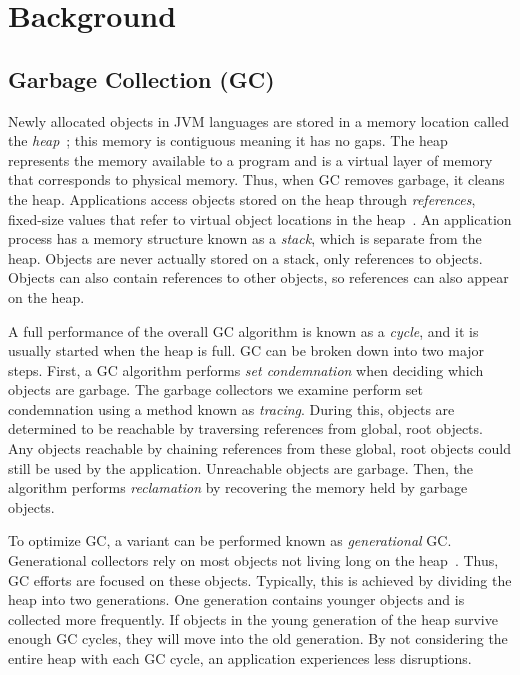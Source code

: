 \documentclass{sig-alternate}
\begin{document}
\section{Background}
\label{sec:background}


\subsection{Garbage Collection (GC)}
\label{sec:garbageCollection}

Newly allocated objects in JVM languages are stored in a memory location called
the \emph{heap}~\cite{oracle:heap}; this memory is contiguous meaning it has no gaps. The heap represents the memory available to a program and is a virtual layer of memory that corresponds to physical memory.
Thus, when GC removes garbage, it cleans the heap.
Applications access objects stored on the heap through \emph{references},
fixed-size values that refer to virtual object locations in the heap~\cite{reilly:reference}. 
An application process has a memory structure known
as a \emph{stack}, which is separate from the heap. Objects are never actually
stored on a stack, only references to objects.
Objects can also contain references to other objects, so references can also appear on the heap.

A full
performance of the overall GC algorithm is known as a \emph{cycle}, and it
is usually started when the heap is full. GC can be broken down into two major steps.
First, a GC algorithm performs \emph{set condemnation} when deciding which objects are 
garbage. The garbage collectors we examine perform set condemnation using a method 
known as \emph{tracing}. During this, objects are determined to be reachable by 
traversing references from global, root objects. Any objects reachable by chaining references
from these global, root objects could still be used by the application. 
Unreachable objects are garbage. Then, the algorithm performs 
\emph{reclamation} by recovering the memory held by garbage objects.

To optimize GC, a variant can be performed known as \emph{generational} GC.
Generational collectors rely on most objects not living long on the 
heap~\cite{Tene:C4}. Thus, GC efforts are focused on these objects. Typically, this is achieved
by dividing the heap into two generations. One generation contains younger objects and
is collected more frequently. If objects in the young generation of the heap survive
enough GC cycles, they will move into the old generation. By not considering the entire
heap with each GC cycle, an application experiences less disruptions.
\end{document}
